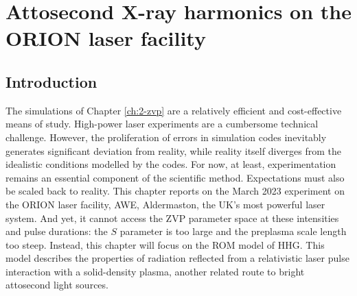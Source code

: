 \chapter{\label{ch:3-orion}Attosecond X-ray harmonics on the ORION laser facility} 

\minitoc

\section{Introduction}
The simulations of Chapter \ref{ch:2-zvp} are a relatively efficient and cost-effective means of study. High-power laser experiments are a cumbersome technical challenge. However, the proliferation of errors in simulation codes inevitably generates significant deviation from reality, while reality itself diverges from the idealistic conditions modelled by the codes. For now, at least, experimentation remains an essential component of the scientific method. Expectations must also be scaled back to reality. This chapter reports on the March 2023 experiment on the ORION laser facility, AWE, Aldermaston, the UK's most powerful laser system. And yet, it cannot access the ZVP parameter space at these intensities and pulse durations: the $S$ parameter is too large and the preplasma scale length too steep. Instead, this chapter will focus on the ROM model of HHG. This model describes the properties of radiation reflected from a relativistic laser pulse interaction with a solid-density plasma, another related route to bright attosecond light sources. 

